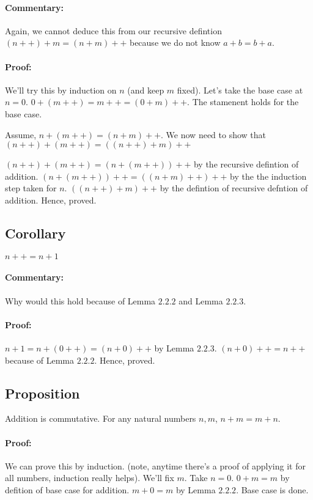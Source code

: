 \documentclass{report}
\begin{document}
\paragraph{Commentary:}Again, we cannot deduce this from our recursive defintion  $\left( n++ \right) + m = \left( n+m \right) ++$ because we do not know $a+b = b+a$. 

\paragraph{Proof: } We'll try this by induction on $n$ (and keep $m$ fixed). Let's take the base case at $n=0$. $0+\left( m++ \right) = m++ = \left( 0 + m \right) ++ $. The stamenent holds for the base case.

Assume, $n+\left( m++ \right) = \left( n+m \right) ++$. We now need to show that $\left( n++ \right) + \left( m++ \right) = \left( \left( n++ \right) + m \right) ++ $

$\left( n++ \right) + \left( m++ \right) = \left( n+\left( m++ \right)  \right) ++ $ by the recursive defintion of addition.
$\left( n + \left( m++ \right)  \right) ++ = \left( \left( n+m \right) ++ \right) ++ $ by the the induction step taken for $n$. 
$\left( \left( n++ \right) +m \right) ++$ by the defintion of recursive defntion of addition. Hence, proved. 

\subsection*{Corollary}
$n++ = n + 1 $ 
\paragraph{Commentary: }Why would this hold because of Lemma  $2.2.2$ and Lemma $2.2.3$. 

\paragraph{Proof:} $n+1 = n + \left( 0++ \right) = \left( n+0 \right) ++$ by Lemma $2.2.3$. $\left( n+0 \right) ++ = n++$ because of Lemma $2.2.2$. Hence, proved.

\subsection{Proposition} Addition is commutative. For any natural numbers $n,m$, $n+m = m+n$. 

\paragraph{Proof: } We can prove this by induction. (note, anytime there's a proof of applying it for all numbers, induction really helps). We'll fix $m$. Take  $n=0$. $0+m = m$ by defition of base case for addition. $m+0 = m$ by Lemma $2.2.2$. Base case is done.
\end{document}
